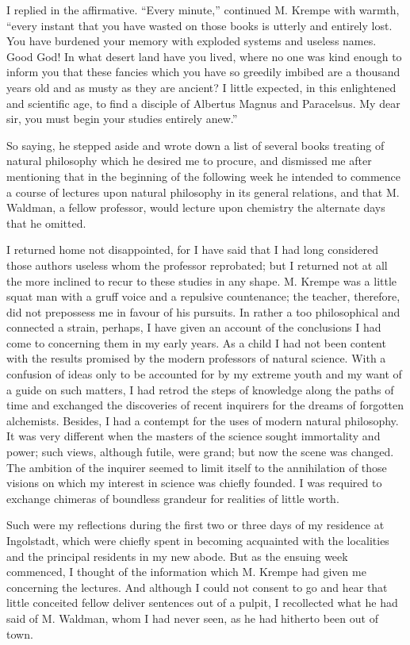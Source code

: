 \documentclass[12pt,openright]{book}
\begin{document}
I replied in the affirmative. “Every minute,” continued M. Krempe with warmth, “every instant that you have wasted on those books is utterly and entirely lost. You have burdened your memory with exploded systems and useless names. Good God! In what desert land have you lived, where no one was kind enough to inform you that these fancies which you have so greedily imbibed are a thousand years old and as musty as they are ancient? I little expected, in this enlightened and scientific age, to find a disciple of Albertus Magnus and Paracelsus. My dear sir, you must begin your studies entirely anew.”

So saying, he stepped aside and wrote down a list of several books treating of natural philosophy which he desired me to procure, and dismissed me after mentioning that in the beginning of the following week he intended to commence a course of lectures upon natural philosophy in its general relations, and that M. Waldman, a fellow professor, would lecture upon chemistry the alternate days that he omitted.

I returned home not disappointed, for I have said that I had long considered those authors useless whom the professor reprobated; but I returned not at all the more inclined to recur to these studies in any shape. M. Krempe was a little squat man with a gruff voice and a repulsive countenance; the teacher, therefore, did not prepossess me in favour of his pursuits. In rather a too philosophical and connected a strain, perhaps, I have given an account of the conclusions I had come to concerning them in my early years. As a child I had not been content with the results promised by the modern professors of natural science. With a confusion of ideas only to be accounted for by my extreme youth and my want of a guide on such matters, I had retrod the steps of knowledge along the paths of time and exchanged the discoveries of recent inquirers for the dreams of forgotten alchemists. Besides, I had a contempt for the uses of modern natural philosophy. It was very different when the masters of the science sought immortality and power; such views, although futile, were grand; but now the scene was changed. The ambition of the inquirer seemed to limit itself to the annihilation of those visions on which my interest in science was chiefly founded. I was required to exchange chimeras of boundless grandeur for realities of little worth.

Such were my reflections during the first two or three days of my residence at Ingolstadt, which were chiefly spent in becoming acquainted with the localities and the principal residents in my new abode. But as the ensuing week commenced, I thought of the information which M. Krempe had given me concerning the lectures. And although I could not consent to go and hear that little conceited fellow deliver sentences out of a pulpit, I recollected what he had said of M. Waldman, whom I had never seen, as he had hitherto been out of town.
\end{document}
